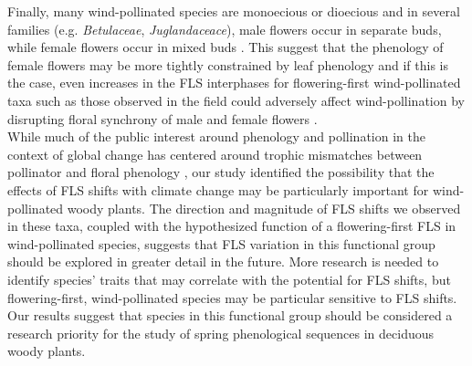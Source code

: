 \documentclass[12pt]{article}\usepackage[]{graphicx}\usepackage[]{color}
\begin{document}
\noindent Finally, many wind-pollinated species are monoecious or dioecious \citep{Ackerman:2000aa} and in several families (e.g. \textit{Betulaceae}, \textit{Juglandaceace}), male flowers occur in separate buds, while female flowers occur in mixed buds \citep{Pope2013}. This suggest that the phenology of female flowers may be more tightly constrained by leaf phenology and if this is the case, even increases in the FLS interphases for flowering-first wind-pollinated taxa such as those observed in the field \citep[e.g.][]{Ma2020:aa} could adversely affect wind-pollination by disrupting floral synchrony of male and female flowers \citep{Alizoti2010,Mutke:2005aa,Elkassaby1991}.\\

\noindent While much of the public interest around phenology and pollination in the context of global change has centered around trophic mismatches between pollinator and floral phenology \citep{Memmott2007}, our study identified the possibility that the effects of FLS shifts with climate change may be particularly important for wind-pollinated woody plants. The direction and magnitude of FLS shifts we observed in these taxa, coupled with the hypothesized function of a flowering-first FLS in wind-pollinated species, suggests that FLS variation in this functional group should be explored in greater detail in the future. More research is needed to identify species' traits that may correlate with the potential for FLS shifts, but flowering-first, wind-pollinated species may be particular sensitive to FLS shifts. Our results suggest that species in this functional group should be considered a research priority for the study of spring phenological sequences in deciduous woody plants.\\     


\end{document}
